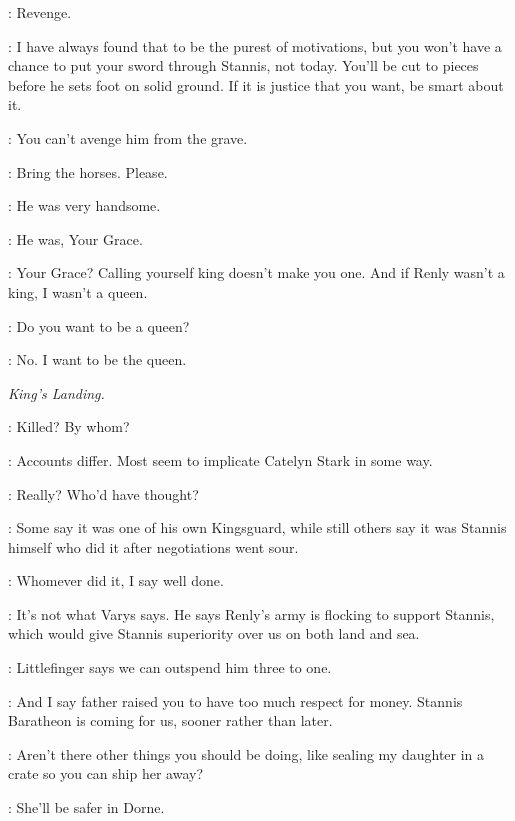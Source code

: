 \LORAS: Revenge. 

\LITTLEFINGER: I have always found that to be the purest of motivations, but you won't have a chance to put your sword through Stannis, not today. You'll be cut to pieces before he sets foot on solid ground. If it is justice that you want, be smart about it. 

\MARGAERY: You can't avenge him from the grave. 

\MARGAERY: Bring the horses. Please. 



\MARGAERY: He was very handsome. 

\LITTLEFINGER: He was, Your Grace. 

\MARGAERY: Your Grace? Calling yourself king doesn't make you one. And if Renly wasn't a king, I wasn't a queen. 

\LITTLEFINGER: Do you want to be a queen? 

\MARGAERY: No. I want to be the queen. 



\scene

\textit{King's Landing.} 


\CERSEI: Killed? By whom? 

\TYRION: Accounts differ. Most seem to implicate Catelyn Stark in some way. 

\CERSEI: Really? Who'd have thought? 

\TYRION: Some say it was one of his own Kingsguard, while still others say it was Stannis himself who did it after negotiations went sour. 

\CERSEI: Whomever did it, I say well done. 

\TYRION: It's not what Varys says. He says Renly's army is flocking to support Stannis, which would give Stannis superiority over us on both land and sea. 

\CERSEI: Littlefinger says we can outspend him three to one. 

\TYRION: And I say father raised you to have too much respect for money. Stannis Baratheon is coming for us, sooner rather than later. 

\CERSEI: Aren't there other things you should be doing, like sealing my daughter in a crate so you can ship her away? 

\TYRION: She'll be safer in Dorne. 

